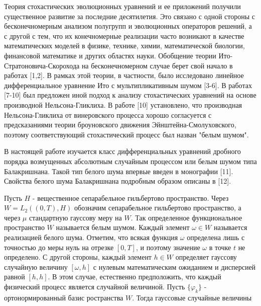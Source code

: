 \documentclass{vzmsthesis}
\begin{document}

\vzmscaption


Теория стохастических эволюционных уравнений и ее приложений получили существенное развитие за последние десятилетия. Это связано с одной стороны с бесконечномерным анализом полугрупп и эволюционных операторов решений, а с другой с тем, что их конечномерные реализации часто возникают в качестве математических моделей в физике, технике,
химии, математической биологии, финансовой математике и других областях науки. Обобщение теории Ито-Стратоновича-Скорохода на бесконечномерном случае берет свой начало в работах [1,2]. В рамках этой теории, в частности, было исследовано линейное дифференциальное уравнение Ито с мультипликативным шумом [3-6]. В работах [7-10] был
предложен иной подход к анализу стохастических уравнений на основе производной Нельсона-Гликлиха. В работе [10] установлено, что производная Нельсона-Гликлиха от винеровского процесса хорошо согласуется с предсказаниями теории броуновского движения Эйнштейна-Смолуховского, поэтому соответствующий стохастический процесс был назван "белым шумом".

В настоящей работе изучается класс дифференциальных уравнений дробного порядка возмущенных абсолютным случайным процессом или белым шумом типа Балакришнана. Такой тип белого шума впервые введен в монографии [11]. Свойства белого шума Балакришнана подробным образом описаны в [12].

Пусть $H$ - вещественное сепарабельное гильбертово пространство. Через $W=L_{2}((0,T),H)$ обозначим сепарабельное гильбертово пространство, а через $\mu$ стандартную гауссову меру на $W$. Так определенное функциональное пространство $W$ называется белым шумом. Каждый элемент $\omega\in W$ называется реализацией белого шума. Отметим, что всякая функция $\omega$ определена лишь с точностью до меры нуль на отрезке $[0, T]$, и поэтому значение $\omega$ в точке $t$ не определено. С другой стороны, каждый элемент $h\in W$ определяет гауссову случайную величину $[\omega, h]$ с нулевым математическим ожиданием и дисперсией равной $[h, h]$. В этом случае, естественно предположить, что каждый физический процесс является случайной величиной. Пусть $\{\varphi_{k}\}$ - ортонормированный базис ространства $W$. Тогда гауссовые случайные величины
\end{document}
